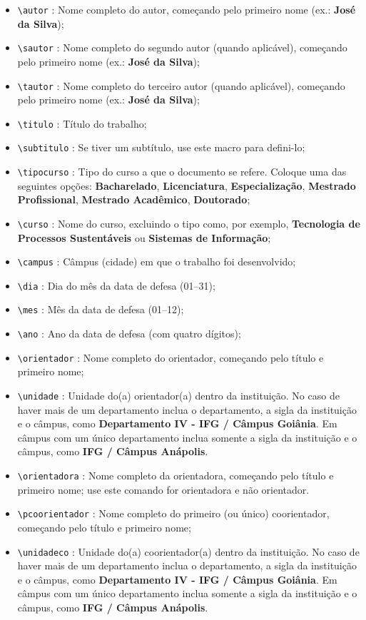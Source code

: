  \begin{itemize}
\item \verb|\autor| : Nome completo do autor, começando pelo primeiro nome (ex.: \textbf{José da Silva});
\item \verb|\sautor| : Nome completo do segundo autor (quando aplicável), começando pelo primeiro nome (ex.:\textbf{ José da Silva});
\item \verb|\tautor| : Nome completo do terceiro autor (quando aplicável), começando pelo primeiro nome (ex.: \textbf{José da Silva});
\item \verb|\titulo| : Título do trabalho;
\item \verb|\subtitulo| : Se tiver um subtítulo, use este macro para defini-lo;
\item \verb|\tipocurso| : Tipo do curso a que o documento se refere. Coloque uma das seguintes opções: \textbf{Bacharelado}, \textbf{Licenciatura}, \textbf{Especialização}, \textbf{Mestrado Profissional}, \textbf{Mestrado Acadêmico}, \textbf{Doutorado};
\item \verb|\curso| : Nome do curso, excluindo o tipo como, por exemplo, \textbf{Tecnologia de Processos Sustentáveis} ou \textbf{Sistemas de Informação}; 
\item \verb|\campus| : Câmpus (cidade) em que o trabalho foi desenvolvido;
\item \verb|\dia| : Dia do mês da data de defesa (01--31);
\item \verb|\mes| : Mês da data de defesa (01--12);
\item \verb|\ano| : Ano da data de defesa (com quatro dígitos);
\item \verb|\orientador| : Nome completo do orientador, começando pelo título e primeiro nome;
\item \verb|\unidade| : Unidade do(a) orientador(a) dentro da instituição. No caso de haver mais de um departamento inclua o departamento, a sigla da instituição e o câmpus, como \textbf{Departamento IV - IFG / Câmpus Goiânia}. Em câmpus com um único departamento inclua somente a sigla da instituição e o câmpus, como \textbf{IFG / Câmpus Anápolis}.
\item \verb|\orientadora| : Nome completo da orientadora, começando pelo título e primeiro nome; use este comando for orientadora e não orientador.
\item \verb|\pcoorientador| : Nome completo do primeiro (ou único) coorientador, começando pelo título e primeiro nome;
\item \verb|\unidadeco| : Unidade do(a) coorientador(a) dentro da instituição. No caso de haver mais de um departamento inclua o departamento, a sigla da instituição e o câmpus, como \textbf{Departamento IV - IFG / Câmpus Goiânia}. Em câmpus com um único departamento inclua somente a sigla da instituição e o câmpus, como \textbf{IFG / Câmpus Anápolis}.

\end{itemize}
